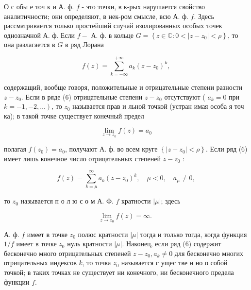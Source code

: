 \documentclass[10pt]{article}
\begin{document}
О с обы е точ к и А. ф. $f$ - это точки, в к-рых нарушается свойство аналитичности; они определяют, в нек-ром смысле, всю А. ф. $f$. Здесь рассматривается только простейший случай изолированных особых точек однозначной А. ф. Если $f-$ А. ф. в кольце $G=\left\{z \in \mathbb{C}: 0<\left|z-z_{0}\right|<\rho\right\}$, то она разлагается в $G$ в ряд Лорана



\[

f(z)=\sum_{k=-\infty}^{+\infty} a_{k}\left(z-z_{0}\right)^{k},

\]



содержащий, вообще говоря, положительные и отрицательные степени разности $z-z_{0}$. Если в ряде (6) отрицательные степени $z-z_{0}$ отсутствуют ( $a_{k}=0$ при $\left.k=-1,-2, \ldots\right)$, то $z_{0}$ называется прав и льной точкой (устран имая особа я точ ка); в такой точке существует конечный предел



\[

\lim _{z \rightarrow z_{0}} f(z)=a_{0}

\]



полагая $f\left(z_{0}\right)=a_{0}$, получают А. ф. во всем круге $\left\{\left|z-z_{0}\right|<\rho\right\}$. Если ряд (6) имеет лишь конечное число отрицательных степеней $z-z_{0}$ :



\[

f(z)=\sum_{k=\mu}^{\infty} a_{k}\left(z-z_{0}\right)^{k}, \quad \mu<0, \quad a_{\mu} \neq 0,

\]



то $z_{0}$ называется п о л ю с о м А. Ф. $f$ кратности $|\mu|$; здесь



\[

\lim _{z \rightarrow z_{0}} f(z)=\infty \text {. }

\]



А. ф. $f$ имеет в точке $z_{0}$ полюс кратности $|\mu|$ тогда и только тогда, когда функция $1 / f$ имеет в точке $z_{0}$ нуль кратности $|\mu|$. Наконец, если ряд (6) содержит бесконечно много отрицательных степеней $z-z_{0}, a_{k} \neq 0$ для бесконечно многих отрицательных индексов $k$, то точка $z_{0}$ называется с ущес тве н но о собой точкой; в таких точках не существует ни конечного, ни бесконечного предела функции $f$.
\end{document}
